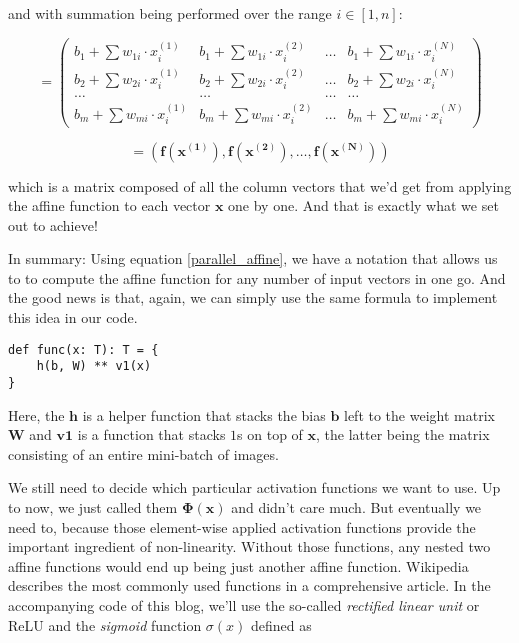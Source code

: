 \documentclass[]{report}
\begin{document}
and with summation being performed over the range \(i \in [1, n]\):

\begin{equation}
= \left(
\begin{array}{cccc} 
b_1 + \sum w_{1i} \cdot x_i^{(1)} & b_1 + \sum w_{1i} \cdot x_i^{(2)} & \dots & b_1 + \sum w_{1i} \cdot x_i^{(N)}
\\
b_2 + \sum w_{2i} \cdot x_i^{(1)} & b_2 + \sum w_{2i} \cdot x_i^{(2)} & \dots & b_2 + \sum w_{2i} \cdot x_i^{(N)}
\\
\dots & \dots & \dots & \dots
\\
b_m + \sum w_{mi} \cdot x_i^{(1)} & b_m + \sum w_{mi} \cdot x_i^{(2)} & \dots & b_m + \sum w_{mi} \cdot x_i^{(N)}
 \end{array}
\right)
\end{equation}

\begin{equation}
= \left(
\mathbf{f}(\mathbf{x^{(1)}}), \mathbf{f}(\mathbf{x^{(2)}}), \dots, \mathbf{f}(\mathbf{x^{(N)}})
\right)
\end{equation}

which is a matrix composed of all the column vectors that we'd get from applying the affine function to each vector \(\mathbf{x}\) one by one. And that is exactly what we set out to achieve!

In summary: Using equation \ref{parallel_affine}, we have a notation that allows us to to compute the affine function for any number of input vectors in one go. And the good news is that, again, we can simply use the same formula to implement this idea in our code.

\begin{lstlisting}[label=fn_optimized, caption=Optimizing affine functions]
def func(x: T): T = {
	h(b, W) ** v1(x)
}
\end{lstlisting}

Here, the \(\mathbf{h}\) is a helper function that stacks the bias \(\mathbf{b} \) left to the weight matrix \(\mathbf{W} \) and  \(\mathbf{v1} \) is a function that stacks \(1\)s on top of \(\mathbf{x} \), the latter being the matrix consisting of an entire mini-batch of images.

\bigskip

We still need to decide which particular activation functions we want to use. Up to now, we just called them \(\mathbf{\Phi(\mathbf{x})} \) and didn't care much. But eventually we need to, because those element-wise applied activation functions provide the important ingredient of non-linearity. Without those functions, any nested two affine functions would end up being just another affine function.  Wikipedia describes the most commonly used functions in a comprehensive article. In the accompanying code of this blog, we'll use  the so-called \emph{rectified linear unit} or ReLU  and the \emph{sigmoid} function \(\sigma(x) \)  defined as 
\end{document}

